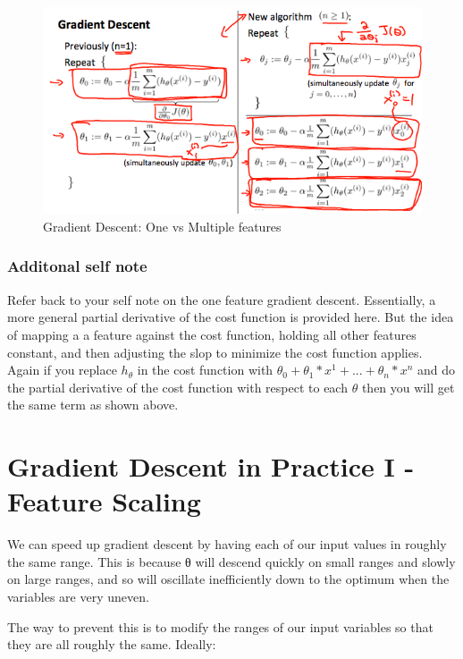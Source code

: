 \documentclass[
]{book}
\begin{document}
\begin{figure}
\centering
\includegraphics{Gradient Descent for Multiple Variables graph 1.png}
\caption{Gradient Descent: One vs Multiple features}
\end{figure}

\hypertarget{additonal-self-note}{%
\subsubsection{Additonal self note}\label{additonal-self-note}}

{
Refer back to your self note on the one feature gradient descent. Essentially, a more general partial derivative of the cost function is provided here. But the idea of mapping a a feature against the cost function, holding all other features constant, and then adjusting the slop to minimize the cost function applies.
Again if you replace \(h_\theta\) in the cost function with \(\theta_0 + \theta_1*x^1 + ... + \theta_n*x^n\) and do the partial derivative of the cost function with respect to each \(\theta\) then you will get the same term as shown above.
}

\hypertarget{gradient-descent-in-practice-i---feature-scaling}{%
\section{Gradient Descent in Practice I - Feature Scaling}\label{gradient-descent-in-practice-i---feature-scaling}}

We can speed up gradient descent by having each of our input values in roughly the same range. This is because θ will descend quickly on small ranges and slowly on large ranges, and so will oscillate inefficiently down to the optimum when the variables are very uneven.

The way to prevent this is to modify the ranges of our input variables so that they are all roughly the same. Ideally:
\end{document}
